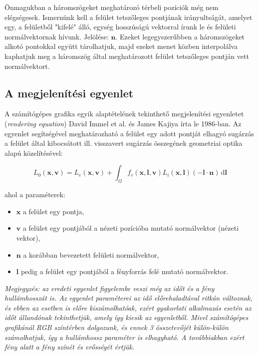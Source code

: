 \documentclass[12pt,oneside]{book}
\begin{document}
Önmagukban a háromszögeket meghatározó térbeli pozíciók még nem elégségesek. Ismernünk kell a felület tetszőleges pontjának irányultságát, amelyet egy, a felületből "kifelé" álló, egység hosszúságú vektorral írunk le és felületi normálvektornak hívunk. Jelölése: \(\mathbf{n}\).
Ezeket legegyszerűbben a háromszögeket alkotó pontokkal együtt tárolhatjuk, majd ezeket menet közben interpolálva kaphatjuk meg a háromszög által meghatározott felület tetszőleges pontján vett normálvektort.

\subsection{A megjelenítési egyenlet}

A számítógépes grafika egyik alaptételének tekinthető megjelenítési egyenletet (\textit{rendering equation}) David Immel et al. és James Kajiya írta le 1986-ban. Az egyenlet segítségével meghatározható a felület egy adott pontját elhagyó sugárzás a felület által kibocsátott ill. visszavert sugárzás összegének geometriai optika alapú közelítésével:

\[
L_0(\mathbf{x},\mathbf{v}) = L_e(\mathbf{x},\mathbf{v}) + \int_\Omega f_r(\mathbf{x},\mathbf{l},\mathbf{v}) L_i(\mathbf{x},\mathbf{l}) (-\mathbf{l} \cdot \mathbf{n})\,\mathrm{d}\mathbf{l}
\]

\noindent
ahol a paraméterek:

\begin{itemize}[noitemsep]
\item \(\mathbf{x}\) a felület egy pontja,
\item \(\mathbf{v}\) a felület egy pontjából a nézeti pozícióba mutató normálvektor (nézeti vektor),
\item \(\mathbf{n}\) a korábban bevezetett felületi normálvektor,
\item \(\mathbf{l}\) pedig a felület egy pontjából a fényforrás felé mutató normálvektor.
\end{itemize}

\noindent
\textit{Megjegyzés: az eredeti egyenlet figyelembe veszi még az időt és a fény hullámhosszát is. Az egyenlet paraméterei az idő előrehaladtával ritkán változnak, és ebben az esetben is előre kiszámolhatóak, ezért gyakorlati alkalmazás esetén az időt állandónak tekinthetjük, amely így kiesik az egyenletből. Mivel számítógépes grafikánál RGB színtérben dolgozunk, és ennek 3 összetevőjét külön-külön számolhatjuk, így a hullámhossz paraméter is elhagyható. A továbbiakban ezért fény alatt a fény színét és erősségét értjük.}
\end{document}
